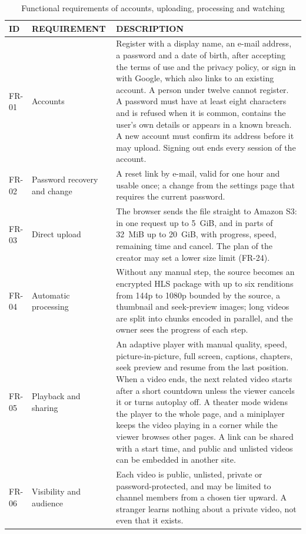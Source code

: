\begin{table}[H]
\centering
\caption{Functional requirements of accounts, uploading, processing and watching}
\label{tab:functional-requirements}
\small
\begin{tabularx}{\textwidth}{p{} p{} X}
\toprule
\textbf{ID} & \textbf{REQUIREMENT} & \textbf{DESCRIPTION} \\
\midrule
FR-01 & Accounts & Register with a display name, an e-mail address, a password and a date of birth, after accepting the terms of use and the privacy policy, or sign in with Google, which also links to an existing account. A person under twelve cannot register. A password must have at least eight characters and is refused when it is common, contains the user's own details or appears in a known breach. A new account must confirm its address before it may upload. Signing out ends every session of the account. \\
FR-02 & Password recovery and change & A reset link by e-mail, valid for one hour and usable once; a change from the settings page that requires the current password. \\
FR-03 & Direct upload & The browser sends the file straight to Amazon S3: in one request up to 5~GiB, and in parts of 32~MiB up to 20~GiB, with progress, speed, remaining time and cancel. The plan of the creator may set a lower size limit (FR-24). \\
FR-04 & Automatic processing & Without any manual step, the source becomes an encrypted HLS package with up to six renditions from 144p to 1080p bounded by the source, a thumbnail and seek-preview images; long videos are split into chunks encoded in parallel, and the owner sees the progress of each step. \\
FR-05 & Playback and sharing & An adaptive player with manual quality, speed, picture-in-picture, full screen, captions, chapters, seek preview and resume from the last position. When a video ends, the next related video starts after a short countdown unless the viewer cancels it or turns autoplay off. A theater mode widens the player to the whole page, and a miniplayer keeps the video playing in a corner while the viewer browses other pages. A link can be shared with a start time, and public and unlisted videos can be embedded in another site. \\
FR-06 & Visibility and audience & Each video is public, unlisted, private or password-protected, and may be limited to channel members from a chosen tier upward. A stranger learns nothing about a private video, not even that it exists. \\

\end{tabularx}
\end{table}
